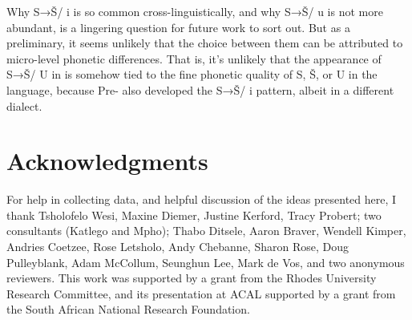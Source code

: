 \documentclass[output=paper,newtxmath,modfonts,nonflat,hidelinks]{langsci/langscibook}
\begin{document}
Why S→Š/ {\longrule} i is so common cross-linguistically, and why S→Š/ {\longrule} u is not more abundant, is a lingering question for future work to sort out. But as a preliminary, it seems unlikely that the choice between them can be attributed to micro-level phonetic differences. That is, it’s unlikely that the appearance of S→Š/ {\longrule} U in  is somehow tied to the fine phonetic quality of S, Š, or U in the language, because Pre- also developed the S→Š/ {\longrule} i pattern, albeit in a different dialect.

\section*{Acknowledgments}

For help in collecting  data, and helpful discussion of the ideas presented here, I thank Tsholofelo Wesi, Maxine Diemer, Justine Kerford, Tracy Probert; two  consultants (Katlego and Mpho); Thabo Ditsele, Aaron Braver, Wendell Kimper, Andries Coetzee, Rose Letsholo, Andy Chebanne, Sharon Rose, Doug Pulleyblank, Adam McCollum, Seunghun Lee, Mark de Vos, and two anonymous reviewers. This work was supported by a grant from the Rhodes University Research Committee, and its presentation at ACAL supported by a grant from the South African National Research Foundation.

\sloppy
\printbibliography[heading=subbibliography,notkeyword=this]
\end{document}
